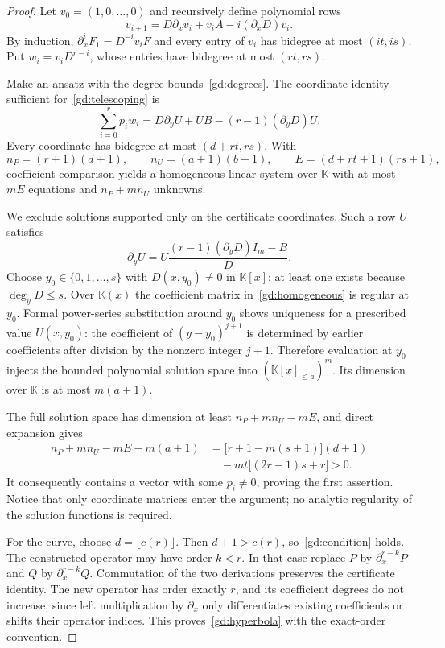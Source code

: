 \begin{proof}
Let $v_0=(1,0,\ldots,0)$ and recursively define polynomial rows
\begin{equation}\label{gd:derivative}
 v_{i+1}=D\partial_xv_i+v_iA-i(\partial_xD)v_i.
\end{equation}
By induction, $\partial_x^iF_1=D^{-i}v_iF$ and every entry of $v_i$
has bidegree at most $(it,is)$. Put $w_i=v_iD^{r-i}$, whose entries
have bidegree at most $(rt,rs)$.

Make an ansatz with the degree bounds~\eqref{gd:degrees}.
The coordinate identity sufficient for~\eqref{gd:telescoping} is
\begin{equation}\label{gd:coefficient}
 \sum_{i=0}^r p_iw_i
  =D\partial_yU+UB-(r-1)(\partial_yD)U.
\end{equation}
Every coordinate has bidegree at most $(d+rt,rs)$. With
\[
 n_P=(r+1)(d+1),\qquad
 n_U=(a+1)(b+1),\qquad
 E=(d+rt+1)(rs+1),
\]
coefficient comparison yields a homogeneous linear system over
$\mathbb K$ with at most $mE$ equations and $n_P+mn_U$ unknowns.

We exclude solutions supported only on the certificate coordinates.
Such a row $U$ satisfies
\begin{equation}\label{gd:homogeneous}
 \partial_yU
   =U\frac{(r-1)(\partial_yD)I_m-B}{D}.
\end{equation}
Choose $y_0\in\{0,1,\ldots,s\}$ with $D(x,y_0)\ne0$ in
$\mathbb K[x]$; at least one exists because $\deg_yD\le s$.
Over $\mathbb K(x)$ the coefficient matrix in~\eqref{gd:homogeneous}
is regular at $y_0$. Formal power-series substitution around $y_0$
shows uniqueness for a prescribed value $U(x,y_0)$: the coefficient
of $(y-y_0)^{j+1}$ is determined by earlier coefficients after division
by the nonzero integer $j+1$. Therefore evaluation at $y_0$ injects
the bounded polynomial solution space into
$(\mathbb K[x]_{\le a})^m$. Its dimension over $\mathbb K$ is at most
$m(a+1)$.

The full solution space has dimension at least $n_P+mn_U-mE$, and
direct expansion gives
\begin{align*}
 n_P+mn_U-mE-m(a+1)
 &=\bigl[r+1-m(s+1)\bigr](d+1)\\
 &\hspace{1em}-mt\bigl[(2r-1)s+r\bigr]>0.
\end{align*}
It consequently contains a vector with some $p_i\ne0$, proving
the first assertion. Notice that only coordinate matrices enter the
argument; no analytic regularity of the solution functions is required.

For the curve, choose $d=\lfloor c(r)\rfloor$. Then
$d+1>c(r)$, so~\eqref{gd:condition} holds. The constructed operator
may have order $k<r$. In that case replace $P$ by
$\partial_x^{r-k}P$ and $Q$ by $\partial_x^{r-k}Q$.
Commutation of the two derivations preserves the certificate identity.
The new operator has order exactly $r$, and its coefficient degrees
do not increase, since left multiplication by $\partial_x$ only
differentiates existing coefficients or shifts their operator indices.
This proves~\eqref{gd:hyperbola} with the exact-order convention.
\end{proof}

